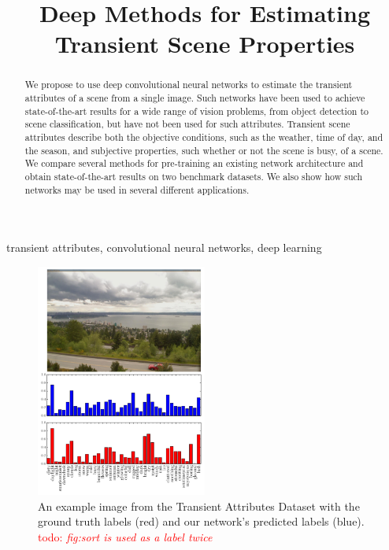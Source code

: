 \documentclass{article}
\title{Deep Methods for Estimating Transient Scene Properties}
\newcommand{\todo}[1]{\textcolor{red}{todo: {\em #1}}}
\begin{document}
\maketitle

\begin{abstract}

We propose to use deep convolutional neural networks to estimate the
transient attributes of a scene from a single image. Such networks
have been used to achieve state-of-the-art results for a wide range of
vision problems, from object detection to scene classification, but
have not been used for such attributes. Transient scene attributes
describe both the objective conditions, such as the weather, time of
day, and the season, and subjective properties, such whether or not
the scene is busy, of a scene. We compare several methods for
pre-training an existing network architecture and obtain
state-of-the-art results on two benchmark datasets.  We also show how
such networks may be used in several different applications.

\end{abstract}

\begin{keywords}
transient attributes, convolutional neural networks, deep learning
\end{keywords}

\begin{figure}[t!]
	\centering
		\includegraphics[width=0.5\textwidth]{figs/bars.pdf}

		\caption{An example image from the Transient Attributes Dataset with the ground truth labels
						 (red) and our network's predicted labels (blue).
             \todo{fig:sort is used as a label twice}}
             
\end{figure}
\end{document}
